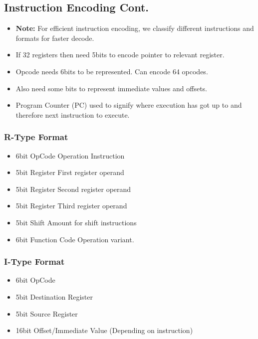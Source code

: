 \documentclass{article}
\newcommand\tab[1][0.5cm]{\hspace*{#1}}
\begin{document}
	\subsection{Instruction Encoding Cont.}
		\begin{itemize}
			\item \textbf{Note: } For efficient instruction encoding, we classify different instructions and formats for faster decode.
			\item If 32 registers then need 5bits to encode pointer to relevant register.
			\item Opcode needs 6bits to be represented. Can encode 64 opcodes.
			\item Also need some bits to represent immediate values and offsets.
			\item Program Counter (PC) used to signify where execution has got up to and therefore next instruction to execute.
			
		\end{itemize}

		\subsubsection{R-Type Format}
			\begin{itemize}
				\item 6bit OpCode \tab \tab \tab Operation Instruction
				\item 5bit Register \tab \tab \tab First register operand
				\item 5bit Register \tab \tab \tab Second register operand
				\item 5bit Register \tab \tab \tab Third register operand
				\item 5bit Shift \tab \tab \tab \tab Amount for shift instructions
				\item 6bit Function Code \tab Operation variant.
			\end{itemize}


		\subsubsection{I-Type Format}
			\begin{itemize}
				\item 6bit OpCode
				\item 5bit Destination Register
				\item 5bit Source Register
				\item 16bit Offset/Immediate Value (Depending on instruction)
			\end{itemize}
\end{document}
